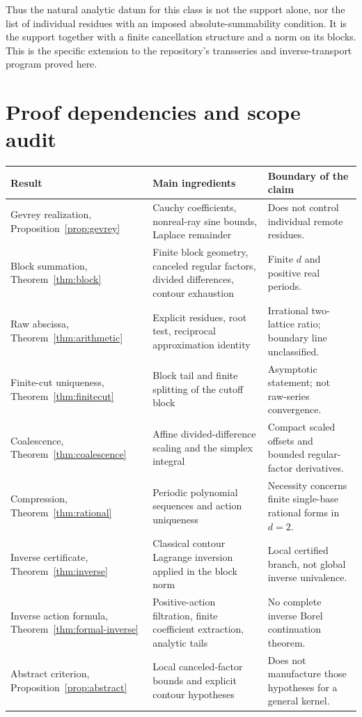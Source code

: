 \documentclass[11pt,a4paper]{article}
\numberwithin{equation}{section}
\theoremstyle{definition}
\theoremstyle{remark}
\begin{document}
Thus the natural analytic datum for this class is not the support alone,
nor the list of individual residues with an imposed absolute-summability
condition. It is the support together with a finite cancellation structure
and a norm on its blocks. This is the specific extension to the
repository's transseries and inverse-transport program proved here.

\clearpage
\appendix
\section{Proof dependencies and scope audit}
\label{app:audit}
\begin{longtable}{>{\raggedright\arraybackslash}p{.23\linewidth}>{\raggedright\arraybackslash}p{.40\linewidth}>{\raggedright\arraybackslash}p{.28\linewidth}}
\toprule
Result & Main ingredients & Boundary of the claim\\
\midrule
\endhead
Gevrey realization, Proposition~\ref{prop:gevrey}
& Cauchy coefficients, nonreal-ray sine bounds, Laplace remainder
& Does not control individual remote residues.\\[5pt]
Block summation, Theorem~\ref{thm:block}
& Finite block geometry, canceled regular factors, divided differences,
contour exhaustion
& Finite $d$ and positive real periods.\\[5pt]
Raw abscissa, Theorem~\ref{thm:arithmetic}
& Explicit residues, root test, reciprocal approximation identity
& Irrational two-lattice ratio; boundary line unclassified.\\[5pt]
Finite-cut uniqueness, Theorem~\ref{thm:finitecut}
& Block tail and finite splitting of the cutoff block
& Asymptotic statement; not raw-series convergence.\\[5pt]
Coalescence, Theorem~\ref{thm:coalescence}
& Affine divided-difference scaling and the simplex integral
& Compact scaled offsets and bounded regular-factor derivatives.\\[5pt]
Compression, Theorem~\ref{thm:rational}
& Periodic polynomial sequences and action uniqueness
& Necessity concerns finite single-base rational forms in $d=2$.\\[5pt]
Inverse certificate, Theorem~\ref{thm:inverse}
& Classical contour Lagrange inversion applied in the block norm
& Local certified branch, not global inverse univalence.\\[5pt]
Inverse action formula, Theorem~\ref{thm:formal-inverse}
& Positive-action filtration, finite coefficient extraction, analytic tails
& No complete inverse Borel continuation theorem.\\[5pt]
Abstract criterion, Proposition~\ref{prop:abstract}
& Local canceled-factor bounds and explicit contour hypotheses
& Does not manufacture those hypotheses for a general kernel.\\
\bottomrule
\end{longtable}
\end{document}
